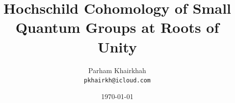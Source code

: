 \documentclass[11pt,letterpaper]{amsart}
\theoremstyle{plain}
\theoremstyle{definition}
\theoremstyle{remark}
\newcommand{\HH}{\operatorname{HH}}
\begin{document}
\title{Hochschild Cohomology of Small Quantum Groups at Roots of Unity}
\author{Parham Khairkhah\\
  \texttt{pkhairkh@icloud.com}}
\date{\today}
\maketitle

%
%
\end{document}
